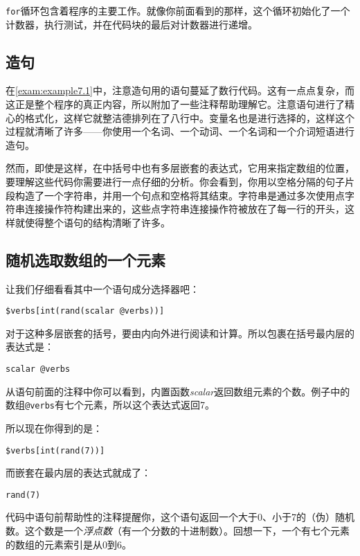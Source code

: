 \verb|for|循环包含着程序的主要工作。就像你前面看到的那样，这个循环初始化了一个计数器，执行测试，并在代码块的最后对计数器进行递增。

\subsection{造句}
在\autoref{exam:example7.1}中，注意造句用的语句蔓延了数行代码。这有一点点复杂，而这正是整个程序的真正内容，所以附加了一些注释帮助理解它。注意语句进行了精心的格式化，这样它就整洁德排列在了八行中。变量名也是进行选择的，这样这个过程就清晰了许多——你使用一个名词、一个动词、一个名词和一个介词短语进行造句。

然而，即使是这样，在中括号中也有多层嵌套的表达式，它用来指定数组的位置，要理解这些代码你需要进行一点仔细的分析。你会看到，你用以空格分隔的句子片段构造了一个字符串，并用一个句点和空格将其结束。字符串是通过多次使用点字符串连接操作符构建出来的，这些点字符串连接操作符被放在了每一行的开头，这样就使得整个语句的结构清晰了许多。

\subsection{随机选取数组的一个元素}
让我们仔细看看其中一个语句成分选择器吧：

\begin{lstlisting}
$verbs[int(rand(scalar @verbs))] 
\end{lstlisting}

对于这种多层嵌套的括号，要由内向外进行阅读和计算。所以包裹在括号最内层的表达式是：

\begin{lstlisting}
scalar @verbs
\end{lstlisting}

从语句前面的注释中你可以看到，内置函数\textit{scalar}返回数组元素的个数。例子中的数组\verb|@verbs|有七个元素，所以这个表达式返回7。

所以现在你得到的是：

\begin{lstlisting}
$verbs[int(rand(7))]
\end{lstlisting}

而嵌套在最内层的表达式就成了：

\begin{lstlisting}
rand(7)
\end{lstlisting}

代码中语句前帮助性的注释提醒你，这个语句返回一个大于0、小于7的（伪）随机数。这个数是一个\textit{浮点数}（有一个分数的十进制数）。回想一下，一个有七个元素的数组的元素索引是从0到6。

